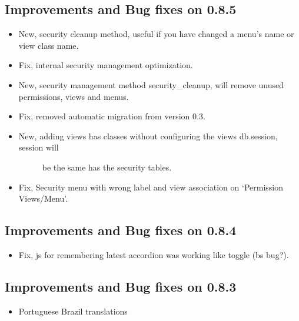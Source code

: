 \documentclass[letterpaper,10pt,english]{sphinxmanual}
\begin{document}
\subsection{Improvements and Bug fixes on 0.8.5}
\label{versions:improvements-and-bug-fixes-on-0-8-5}\begin{itemize}
\item {} 
New, security cleanup method, useful if you have changed a menu's name or view class name.

\item {} 
Fix, internal security management optimization.

\item {} 
New, security management method security\_cleanup, will remove unused permissions, views and menus.

\item {} 
Fix, removed automatic migration from version 0.3.

\item {} \begin{description}
\item[{New, adding views has classes without configuring the views db.session, session will}] \leavevmode
be the same has the security tables.

\end{description}

\item {} 
Fix, Security menu with wrong label and view association on `Permission Views/Menu'.

\end{itemize}


\subsection{Improvements and Bug fixes on 0.8.4}
\label{versions:improvements-and-bug-fixes-on-0-8-4}\begin{itemize}
\item {} 
Fix, js for remembering latest accordion was working like toggle (bs bug?).

\end{itemize}


\subsection{Improvements and Bug fixes on 0.8.3}
\label{versions:improvements-and-bug-fixes-on-0-8-3}\begin{itemize}
\item {} 
Portuguese Brazil translations

\end{itemize}
\end{document}
